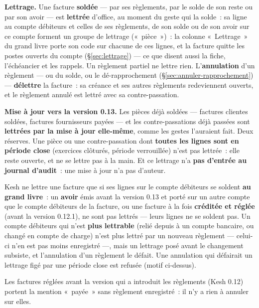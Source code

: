\documentclass[a4paper,11pt,oneside]{article}
\begin{document}
\textbf{Lettrage.} Une facture \textbf{soldée} --- par ses règlements, par le solde de son reste
ou par son avoir --- est \textbf{lettrée} d'office, au moment du geste qui la solde~: sa ligne au
compte débiteurs et celles de ses règlements, de son solde ou de son avoir sur ce compte forment
un groupe de lettrage («~pièce~»)~: la colonne «~Lettrage~» du grand livre porte son code sur
chacune de ces lignes, et la facture quitte les postes ouverts du compte (\S\ref{sec:lettrage}) ---
ce que disent aussi la fiche, l'échéancier et les rappels. Un règlement partiel ne lettre rien. L'\textbf{annulation} d'un règlement --- ou du
solde, ou le dé-rapprochement (\S\ref{sec:annuler-rapprochement}) --- \textbf{délettre} la
facture~: sa créance et ses autres règlements redeviennent ouverts, et le règlement annulé est
lettré avec sa contre-passation.

\begin{keshnote}
\textbf{Mise à jour vers la version 0.13.} Les pièces déjà soldées --- factures clientes soldées,
factures fournisseurs payées --- et les contre-passations déjà passées sont \textbf{lettrées par
la mise à jour elle-même}, comme les gestes l'auraient fait. Deux réserves. Une pièce ou une
contre-passation dont \textbf{toutes les lignes sont en période close} (exercices clôturés,
période verrouillée) n'est pas lettrée~: elle reste ouverte, et ne se lettre pas à la main. Et ce
lettrage n'a \textbf{pas d'entrée au journal d'audit}~: une mise à jour n'a pas d'auteur.
\end{keshnote}

Kesh ne lettre une facture que si ses lignes sur le compte débiteurs se soldent \textbf{au grand
livre}~: un \textbf{avoir} émis avant la version 0.13 et porté sur un autre compte que le compte
débiteurs de la facture, ou une facture à la fois \textbf{créditée et réglée} (avant la version
0.12.1), ne sont pas lettrés --- leurs lignes ne se soldent pas. Un compte débiteurs qui n'est
\textbf{plus lettrable} (relié depuis à un compte bancaire, ou changé en compte de charge) n'est
plus lettré par un nouveau règlement --- celui-ci n'en est pas moins enregistré ---, mais un
lettrage posé avant le changement subsiste, et l'annulation d'un règlement le défait. Une
annulation qui défairait un lettrage figé par une période close est refusée (motif ci-dessus).

\begin{keshnote}
Les factures réglées avant la version qui a introduit les règlements (Kesh 0.12) portent la
mention «~payée~» sans règlement enregistré~: il n'y a rien à annuler sur elles.
\end{keshnote}
\end{document}
